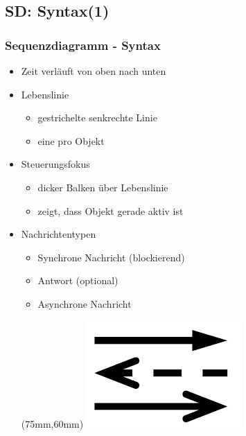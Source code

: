 \documentclass[18pt]{beamer}
\begin{document}
	\subsection{SD: Syntax(1)}
	\begin{frame}
		\frametitle{Sequenzdiagramm - Syntax}
		\begin{itemize}
			\item Zeit verläuft von oben nach unten
			\item Lebenslinie
			\begin{itemize}
				\item gestrichelte senkrechte Linie
				\item eine pro Objekt
			\end{itemize}
			\item Steuerungsfokus
			\begin{itemize}
				\item dicker Balken über Lebenslinie
				\item zeigt, dass Objekt gerade aktiv ist
			\end{itemize}
			\item Nachrichtentypen
			\begin{itemize}
				\item Synchrone Nachricht (blockierend)
				\item Antwort (optional)
				\item Asynchrone Nachricht
			\end{itemize}
			\begin{textblock*}{20mm}(75mm,60mm)
				\includegraphics[scale=0.4]{./pics/tut2/sd_met.png}
			\end{textblock*}
		\end{itemize}
	\end{frame}
\end{document}
